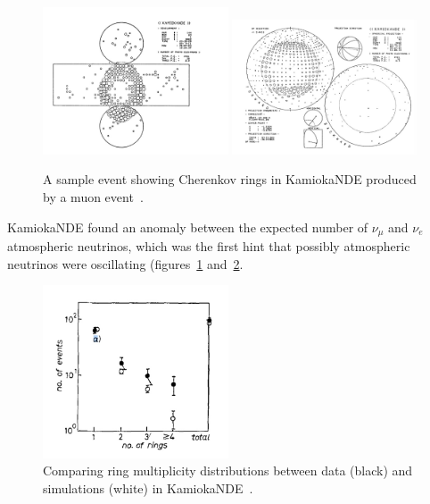 \begin{figure}[h!]
\centering
  \centering
\includegraphics[width=0.49\textwidth]{figures/Kamioka2.jpeg}
\includegraphics[width=0.49\textwidth]{figures/Kamioka3.jpeg}
\vspace{2mm}
\caption{A sample event showing Cherenkov rings in KamiokaNDE produced by a muon event~\cite{58KAMIOKA}.}
\label{fig:Kam2}
\end{figure}
KamiokaNDE found an anomaly between the expected number of $\nu_\mu$ and $\nu_e$ atmospheric neutrinos, which was the first hint that possibly atmospheric neutrinos were oscillating (figures~\ref{fig:Kam2} and~\ref{fig:Kam3}.
\begin{figure}[h!]
\centering
  \centering
\includegraphics[width=0.49\textwidth]{figures/Kamioka4.jpeg}
\vspace{2mm}
\caption{Comparing ring multiplicity distributions between data (black) and simulations (white) in KamiokaNDE~\cite{59KAMIOKA}.}
\label{fig:Kam3}
\end{figure}

